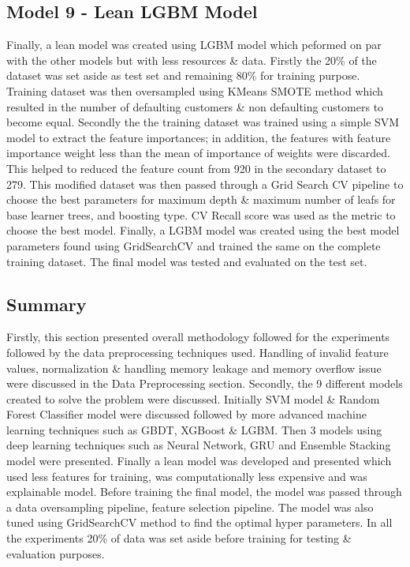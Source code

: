 \documentclass[twoside,11pt,a4paper]{article}
\begin{document}
\subsection{Model 9 - Lean \acs{LGBM} Model}
Finally, a lean model was created using \acs{LGBM} model which peformed on par with the other models but with less resources \& data. Firstly the 20\% of the dataset was set aside as test set and remaining 80\% for training purpose. Training dataset was then oversampled using KMeans \acs{SMOTE} method which resulted in the number of defaulting customers \& non defaulting customers to become equal. Secondly the the training dataset was trained using a simple \acs{SVM} model to extract the feature importances; in addition, the features with feature importance weight less than the mean of importance of weights were discarded. This helped to reduced the feature count from 920 in the secondary dataset to 279. This modified dataset was then passed through a Grid Search CV pipeline to choose the best parameters for maximum depth \& maximum number of leafs for base learner trees, and boosting type. \acf{CV} Recall score was used as the metric to choose the best model. Finally, a \acs{LGBM} model was created using the best model parameters found using GridSearchCV and trained the same on the complete training dataset. The final model was tested and evaluated on the test set.

\subsection{Summary}
Firstly, this section presented overall methodology followed for the experiments followed by the data preprocessing techniques used. Handling of invalid feature values, normalization \& handling memory leakage and memory overflow issue were discussed in the Data Preprocessing section. Secondly, the 9 different models created to solve the problem were discussed. Initially \acs{SVM} model \& Random Forest Classifier model were discussed followed by more advanced machine learning techniques such as \acs{GBDT}, \acs{XGBoost} \& \acs{LGBM}. Then 3 models using deep learning techniques such as Neural Network, \acs{GRU}  and Ensemble Stacking model were presented. Finally a lean model was developed and presented which used less features for training, was computationally less expensive and was explainable model. Before training the final model, the model was passed through a data oversampling pipeline, feature selection pipeline. The model was also tuned using GridSearchCV method to find the optimal hyper parameters. In all the experiments 20\% of data was set aside before training for testing \& evaluation purposes.
\vfill
\clearpage
\end{document}
